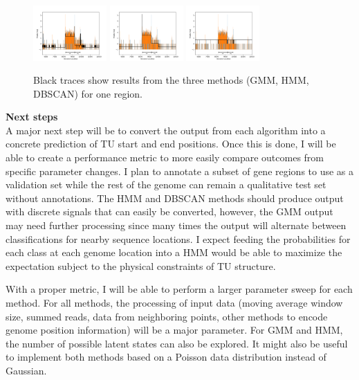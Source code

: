 \documentclass[11pt]{article}
\begin{document}
\begin{figure}[H]
    \centering
    \includegraphics[align=c, width=0.25\textwidth]{1_gmm.png}
    \includegraphics[align=c, width=0.25\textwidth]{1_hmm.png}
    \includegraphics[align=c, width=0.25\textwidth]{1_dbscan.png}
    \caption{Black traces show results from the three methods (GMM, HMM, DBSCAN) for one region.}
    \label{fig:results}
\end{figure}

\textbf{Next steps} \vspace{4pt} \\
A major next step will be to convert the output from each algorithm into a concrete prediction of TU start and end positions.  Once this is done, I will be able to create a performance metric to more easily compare outcomes from specific parameter changes.  I plan to annotate a subset of gene regions to use as a validation set while the rest of the genome can remain a qualitative test set without annotations.  The HMM and DBSCAN methods should produce output with discrete signals that can easily be converted, however, the GMM output may need further processing since many times the output will alternate between classifications for nearby sequence locations.  I expect feeding the probabilities for each class at each genome location into a HMM would be able to maximize the expectation subject to the physical constraints of TU structure. \vspace{8pt}

With a proper metric, I will be able to perform a larger parameter sweep for each method.  For all methods, the processing of input data (moving average window size, summed reads, data from neighboring points, other methods to encode genome position information) will be a major parameter.  For GMM and HMM, the number of possible latent states can also be explored.  It might also be useful to implement both methods based on a Poisson data distribution instead of Gaussian. \vspace{8pt}
\end{document}
